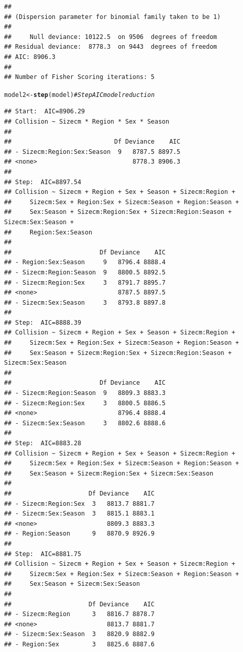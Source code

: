 \documentclass{article}\usepackage[]{graphicx}\usepackage[]{color}
\makeatletter
\newcommand{\hlcom}[1]{\textcolor[rgb]{0.678,0.584,0.686}{\textit{#1}}}%
\newcommand{\hlstd}[1]{\textcolor[rgb]{0.345,0.345,0.345}{#1}}%
\newcommand{\hlkwb}[1]{\textcolor[rgb]{0.69,0.353,0.396}{#1}}%
\newcommand{\hlkwd}[1]{\textcolor[rgb]{0.737,0.353,0.396}{\textbf{#1}}}%
\newenvironment{kframe}{%
 \def\at@end@of@kframe{}%
 \ifinner\ifhmode%
  \def\at@end@of@kframe{\end{minipage}}%
  \begin{minipage}{\columnwidth}%
 \fi\fi%
 \def\FrameCommand##1{\hskip\@totalleftmargin \hskip-\fboxsep
 \colorbox{shadecolor}{##1}\hskip-\fboxsep
     \hskip-\linewidth \hskip-\@totalleftmargin \hskip\columnwidth}%
 \MakeFramed {\advance\hsize-\width
   \@totalleftmargin\z@ \linewidth\hsize
   \@setminipage}}%
 {\par\unskip\endMakeFramed%
 \at@end@of@kframe}
\newenvironment{knitrout}{}{} %
\makeatother
\begin{document}
\begin{knitrout}
\begin{kframe}
\begin{verbatim}
## 
## (Dispersion parameter for binomial family taken to be 1)
## 
##     Null deviance: 10122.5  on 9506  degrees of freedom
## Residual deviance:  8778.3  on 9443  degrees of freedom
## AIC: 8906.3
## 
## Number of Fisher Scoring iterations: 5
\end{verbatim}
\begin{alltt}
\hlstd{model2} \hlkwb{<-} \hlkwd{step}\hlstd{(model)} \hlcom{#Step AIC model reduction }
\end{alltt}
\begin{verbatim}
## Start:  AIC=8906.29
## Collision ~ Sizecm * Region * Sex * Season
## 
##                            Df Deviance    AIC
## - Sizecm:Region:Sex:Season  9   8787.5 8897.5
## <none>                          8778.3 8906.3
## 
## Step:  AIC=8897.54
## Collision ~ Sizecm + Region + Sex + Season + Sizecm:Region + 
##     Sizecm:Sex + Region:Sex + Sizecm:Season + Region:Season + 
##     Sex:Season + Sizecm:Region:Sex + Sizecm:Region:Season + Sizecm:Sex:Season + 
##     Region:Sex:Season
## 
##                        Df Deviance    AIC
## - Region:Sex:Season     9   8796.4 8888.4
## - Sizecm:Region:Season  9   8800.5 8892.5
## - Sizecm:Region:Sex     3   8791.7 8895.7
## <none>                      8787.5 8897.5
## - Sizecm:Sex:Season     3   8793.8 8897.8
## 
## Step:  AIC=8888.39
## Collision ~ Sizecm + Region + Sex + Season + Sizecm:Region + 
##     Sizecm:Sex + Region:Sex + Sizecm:Season + Region:Season + 
##     Sex:Season + Sizecm:Region:Sex + Sizecm:Region:Season + Sizecm:Sex:Season
## 
##                        Df Deviance    AIC
## - Sizecm:Region:Season  9   8809.3 8883.3
## - Sizecm:Region:Sex     3   8800.5 8886.5
## <none>                      8796.4 8888.4
## - Sizecm:Sex:Season     3   8802.6 8888.6
## 
## Step:  AIC=8883.28
## Collision ~ Sizecm + Region + Sex + Season + Sizecm:Region + 
##     Sizecm:Sex + Region:Sex + Sizecm:Season + Region:Season + 
##     Sex:Season + Sizecm:Region:Sex + Sizecm:Sex:Season
## 
##                     Df Deviance    AIC
## - Sizecm:Region:Sex  3   8813.7 8881.7
## - Sizecm:Sex:Season  3   8815.1 8883.1
## <none>                   8809.3 8883.3
## - Region:Season      9   8870.9 8926.9
## 
## Step:  AIC=8881.75
## Collision ~ Sizecm + Region + Sex + Season + Sizecm:Region + 
##     Sizecm:Sex + Region:Sex + Sizecm:Season + Region:Season + 
##     Sex:Season + Sizecm:Sex:Season
## 
##                     Df Deviance    AIC
## - Sizecm:Region      3   8816.7 8878.7
## <none>                   8813.7 8881.7
## - Sizecm:Sex:Season  3   8820.9 8882.9
## - Region:Sex         3   8825.6 8887.6

\end{verbatim}
\end{kframe}
\end{knitrout}
\end{document}
